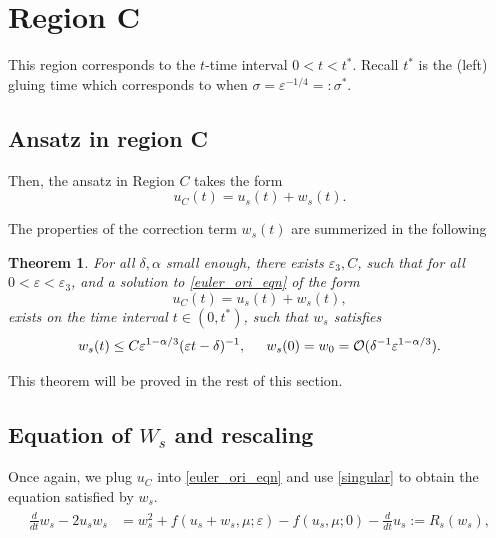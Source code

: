 \documentclass[letterpaper,11pt]{article}
\newcommand{\rmO}{\mathcal{O}}
\newcommand{\eps}{\varepsilon}
\numberwithin{equation}{section}
\theoremstyle{plain}
\newtheorem{theorem}{Theorem}[section]
\begin{document}
\section{Region C}\label{sec_C}
This region corresponds to the $t$-time interval $0<t<t^*$. Recall $t^*$ is the (left) gluing time which corresponds to when $\sigma = \eps^{-1/4}=:\sigma^*$.

\subsection{Ansatz in region C}



Then, the ansatz in Region $C$ takes the form 
\[
u_C(t) = u_s(t)  +w_s(t).
\]

The properties of the correction term $w_s(t)$ are summerized in the following 
\begin{theorem}\label{thm_s}
For all $\delta, \alpha$ small enough, there exists $\eps_3,C$, such that for all $0<\eps <\eps_3$, and a solution to \eqref{euler_ori_eqn} of the form
\[
u_C(t ) = u_s(t) + w_s(t),
\]
exists on the time interval $t \in (0,t^*)$, such that $w_s$ satisfies
\begin{equation}\label{thm_s_1}
w_s(t) \le C\eps^{1-\alpha/3} (\eps t -\delta)^{-1}, \hspace{0.2in} w_s(0) = w_0 = \rmO(\delta^{-1}\eps^{1-\alpha/3}).
\end{equation}
 
\end{theorem}

This theorem will be proved in the rest of this section.

\subsection{Equation of \texorpdfstring{$W_{s}$}{Ws} and rescaling }

Once again, we plug $u_C$ into \eqref{euler_ori_eqn} and use \eqref{singular} to obtain the equation satisfied by $w_s$.
\begin{align}\label{Eqn_ws}
\begin{split}
\frac{d}{dt} w_{s} -2u_sw_s &=   w_s^2 + f(u_s+w_s, \mu; \eps)-f(u_s, \mu; 0) - \frac{d}{dt}u_s:= R_s(w_s),
\end{split}
\end{align}
\end{document}
